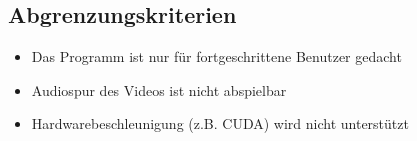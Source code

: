 \subsection{Abgrenzungskriterien}

\begin{itemize}
	\item Das Programm ist nur für fortgeschrittene Benutzer gedacht
	\item Audiospur des Videos ist nicht abspielbar
	\item Hardwarebeschleunigung (z.B. CUDA) wird nicht unterstützt
\end{itemize}
